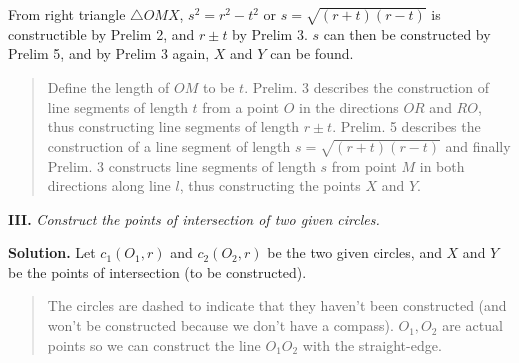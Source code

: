 From right triangle $\triangle OMX$, $s^2=r^2-t^2$ or $s=\sqrt{(r+t)(r-t)}$ is constructible by Prelim 2, and $r \pm t$ by Prelim 3. $s$ can then be constructed by Prelim 5, and by Prelim 3 again, $X$ and $Y$ can be found. 
\begin{quote}
Define the length of $OM$ to be $t$. Prelim. 3 describes the construction of line segments of length $t$ from a point $O$ in the directions $OR$ and $RO$, thus constructing line segments of length $r\pm t$. Prelim. 5 describes the construction of a line segment of length $s=\sqrt{(r+t)(r-t)}$ and finally Prelim. 3 constructs line segments of length $s$ from point $M$ in both directions along line $l$, thus constructing the points $X$ and $Y$.
\end{quote}

\textbf{III.} \textit{Construct the points of intersection of two given circles.}

\textbf{Solution.} Let $c_1(O_1,r)$ and $c_2(O_2,r)$ be the two given circles, and $X$ and $Y$ be the points of intersection (to be constructed).
\begin{center}
\end{center}
\begin{quote}
\vspace*{-8pt}
The circles are dashed to indicate that they haven't been constructed (and won't be constructed because we don't have a compass). $O_1,O_2$ are actual points so we can construct the line $O_1O_2$ with the straight-edge.
\vspace*{-12pt}
\end{quote}

